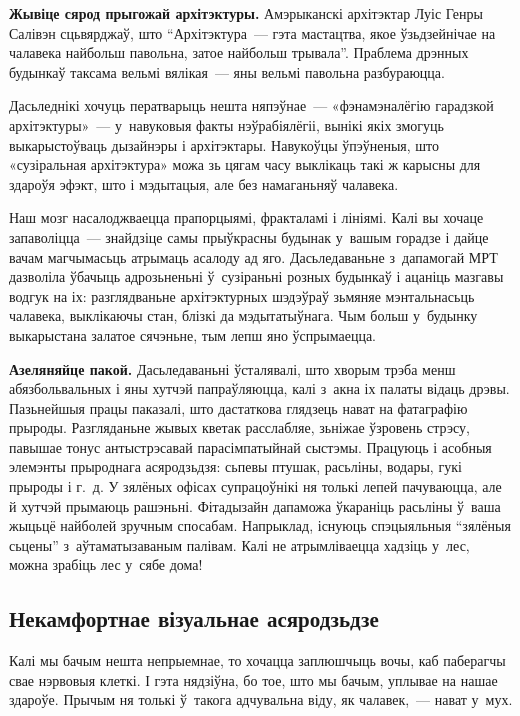 \textbf{Жывіце сярод прыгожай архітэктуры.} Амэрыканскі архітэктар Луіс Генры Салівэн сцьвярджаў, што ``Архітэктура~--- гэта мастацтва, якое ўзьдзейнічае на чалавека найбольш павольна, затое найбольш трывала''. Праблема дрэнных будынкаў таксама вельмі вялікая~--- яны вельмі павольна разбураюцца. 

Дасьледнікі хочуць ператварыць нешта няпэўнае~--- «фэнамэналёгію гарадзкой архітэктуры»~--- у~навуковыя факты нэўрабіялёгіі, вынікі якіх змогуць выкарыстоўваць дызайнэры і архітэктары. Навукоўцы ўпэўненыя, што «сузіральная архітэктура» можа зь цягам часу выклікаць такі ж карысны для здароўя эфэкт, што і мэдытацыя, але без намаганьняў чалавека.

Наш мозг насалоджваецца прапорцыямі, фракталамі і лініямі. Калі вы хочаце запаволіцца~--- знайдзіце самы прыўкрасны будынак у~вашым горадзе і дайце вачам магчымасьць атрымаць асалоду ад яго. Дасьледаваньне з~дапамогай МРТ дазволіла ўбачыць адрозьненьні ў~сузіраньні розных будынкаў і ацаніць мазгавы водгук на іх: разглядваньне архітэктурных шэдэўраў зьмяняе мэнтальнасьць чалавека, выклікаючы стан, блізкі да мэдытатыўнага. Чым больш у~будынку выкарыстана залатое сячэньне, тым лепш яно ўспрымаецца.

\textbf{Азеляняйце пакой.} Дасьледаваньні ўсталявалі, што хворым трэба менш абязбольвальных і яны хутчэй папраўляюцца, калі з~акна іх палаты відаць дрэвы. Пазьнейшыя працы паказалі, што дастаткова глядзець нават на фатаграфію прыроды. Разгляданьне жывых кветак расслабляе, зьніжае ўзровень стрэсу, павышае тонус антыстрэсавай парасімпатыйнай сыстэмы. Працуюць і асобныя элемэнты прыроднага асяродзьдзя: сьпевы птушак, расьліны, водары, гукі прыроды і г.~д. У зялёных офісах супрацоўнікі ня толькі лепей пачуваюцца, але й хутчэй прымаюць рашэньні. Фітадызайн дапаможа ўкараніць расьліны ў~ваша жыцьцё найболей зручным спосабам. Напрыклад, існуюць спэцыяльныя ``зялёныя сьцены'' з~аўтаматызаваным палівам. Калі не атрымліваецца хадзіць у~лес, можна зрабіць лес у~сябе дома!

\subsection*{Некамфортнае візуальнае асяродзьдзе}

Калі мы бачым нешта непрыемнае, то хочацца заплюшчыць вочы, каб паберагчы свае нэрвовыя клеткі. І гэта нядзіўна, бо тое, што мы бачым, уплывае на нашае здароўе. Прычым ня толькі ў~такога адчувальна віду, як чалавек,~--- нават у~мух.

